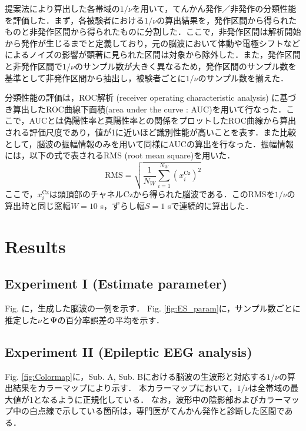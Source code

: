 \documentclass[journal]{IEEEtran}
\begin{document}
提案法により算出した各帯域の$1/\nu$を用いて，てんかん発作／非発作の分類性能を評価した．まず，各被験者における$1/\nu$の算出結果を，発作区間から得られたものと非発作区間から得られたものに分割した．ここで，非発作区間は解析開始から発作が生じるまでと定義しており，元の脳波において体動や電極シフトなどによるノイズの影響が顕著に見られた区間は対象から除外した．また，発作区間と非発作区間で$1/\nu$のサンプル数が大きく異なるため，発作区間のサンプル数を基準として非発作区間から抽出し，被験者ごとに$1/\nu$のサンプル数を揃えた．

分類性能の評価は，ROC解析 (receiver operating characteristic analysis) に基づき算出したROC曲線下面積(area under the curve : AUC)を用いて行なった．ここで，AUCとは偽陽性率と真陽性率との関係をプロットしたROC曲線から算出される評価尺度であり，値が1に近いほど識別性能が高いことを表す．また比較として，脳波の振幅情報のみを用いて同様にAUCの算出を行なった．振幅情報には，以下の式で表されるRMS (root mean square)を用いた\cite{Hamedi2014}．
\begin{equation}%
		\mathrm{RMS} = \sqrt{\frac{1}{N_W} \sum_{i=1}^{N_W} (x_i^\mathrm{Cz})^2}
\end{equation}
ここで，$x_i^\mathrm{Cz}$は頭頂部のチャネルCzから得られた脳波である．このRMSを$1/\nu$の算出時と同じ窓幅$W = 10$ s，ずらし幅$S = 1$ sで連続的に算出した．

\section{Results}
\subsection{Experiment I (Estimate parameter)}
Fig. に，生成した脳波の一例を示す．
Fig. \ref{fig:ES_param}に，サンプル数ごとに推定した$\nu$と$\mathbf{\Psi}$の百分率誤差の平均を示す．

\subsection{Experiment II (Epileptic EEG analysis)}
Fig. \ref{fig:Colormap}に，Sub. A, Sub. Bにおける脳波の生波形と対応する$1/\nu$の算出結果をカラーマップにより示す．
本カラーマップにおいて，$1/\nu$は全帯域の最大値が1となるように正規化している．
なお，波形中の陰影部およびカラーマップ中の白点線で示している箇所は，専門医がてんかん発作と診断した区間である．
\end{document}
